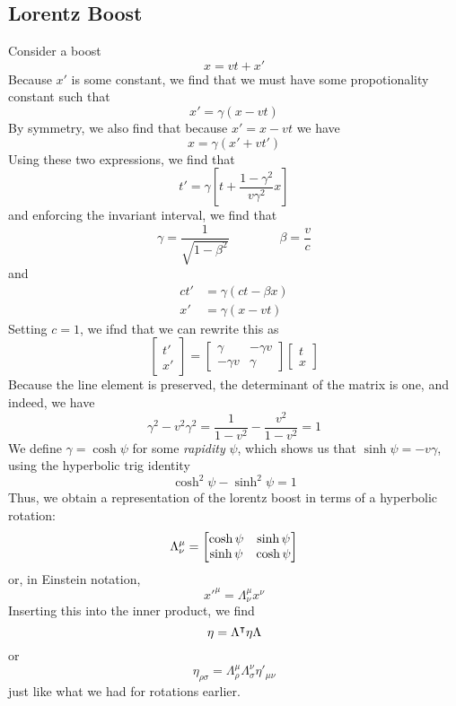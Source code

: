 \subsection{Lorentz Boost}
Consider a boost
\[x = vt+x'\]
Because \(x'\) is some constant, we find that we must have some propotionality constant such that
\[x' = \gamma(x-vt)\]
By symmetry, we also find that because \(x' = x-vt\) we have
\[x = \gamma(x'+vt')\]
Using these two expressions, we find that
\[t' = \gamma\left[t+\frac{1-\gamma^2}{v\gamma^2}x\right]\]
and enforcing the invariant interval, we find that
\begin{equation}\gamma = \frac{1}{\sqrt{1-\beta^2}}\qquad\qquad \beta = \frac{v}{c}\end{equation}
and
\begin{subequations}
	\begin{align}
		ct'&=\gamma(ct-\beta x)\\
		x'&=\gamma(x-vt)
	\end{align}
\end{subequations}
Setting \(c=1\), we ifnd that we can rewrite this as
\begin{equation}
	\begin{bmatrix}
		t'\\
		x'
	\end{bmatrix} = \begin{bmatrix}
	\gamma & -\gamma v\\
	-\gamma v & \gamma
	\end{bmatrix} \begin{bmatrix}
		t\\x
	\end{bmatrix}
\end{equation}
Because the line element is preserved, the determinant of the matrix is one, and indeed, we have
\[\gamma^2-v^2\gamma^2 = \frac{1}{1-v^2} - \frac{v^2}{1-v^2}=1\]
We define \(\gamma=  \cosh\psi\) for some \emph{rapidity} \(\psi\), which shows us that \(\sinh\psi = -v\gamma\), using the hyperbolic trig identity
\[\cosh^2\psi -\sinh^2\psi = 1\]
Thus, we obtain a representation of the lorentz boost in terms of a hyperbolic rotation:
\begin{equation}
	\Lambda_\nu^\mu = \begin{bmatrix}
		\cosh\psi & \sinh\psi\\\sinh\psi&\cosh\psi
	\end{bmatrix}
\end{equation}
or, in Einstein notation,
\begin{equation}
	x'^\mu = \Lambda_\nu^\mu x^\nu
\end{equation}
Inserting this into the inner product, we find
\[
	\eta = \Lambda^\intercal\eta\Lambda
\]
or
\begin{equation}
	\eta_{\rho\sigma} = \Lambda_\rho^\mu\Lambda_\sigma^\nu\eta'_{\mu\nu}
\end{equation}
just like what we had for rotations earlier.

